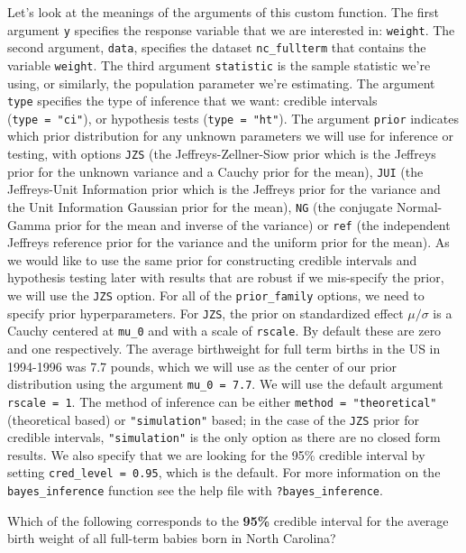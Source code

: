\documentclass[]{article}
\begin{document}
Let's look at the meanings of the arguments of this custom function. The
first argument \texttt{y} specifies the response variable that we are
interested in: \texttt{weight}. The second argument, \texttt{data},
specifies the dataset \texttt{nc\_fullterm} that contains the variable
\texttt{weight}. The third argument \texttt{statistic} is the sample
statistic we're using, or similarly, the population parameter we're
estimating. The argument \texttt{type} specifies the type of inference
that we want: credible intervals (\texttt{type\ =\ "ci"}), or hypothesis
tests (\texttt{type\ =\ "ht"}). The argument \texttt{prior} indicates
which prior distribution for any unknown parameters we will use for
inference or testing, with options \texttt{JZS} (the
Jeffreys-Zellner-Siow prior which is the Jeffreys prior for the unknown
variance and a Cauchy prior for the mean), \texttt{JUI} (the
Jeffreys-Unit Information prior which is the Jeffreys prior for the
variance and the Unit Information Gaussian prior for the mean),
\texttt{NG} (the conjugate Normal-Gamma prior for the mean and inverse
of the variance) or \texttt{ref} (the independent Jeffreys reference
prior for the variance and the uniform prior for the mean). As we would
like to use the same prior for constructing credible intervals and
hypothesis testing later with results that are robust if we mis-specify
the prior, we will use the \texttt{JZS} option. For all of the
\texttt{prior\_family} options, we need to specify prior
hyperparameters. For \texttt{JZS}, the prior on standardized effect
\(\mu/\sigma\) is a Cauchy centered at \texttt{mu\_0} and with a scale
of \texttt{rscale}. By default these are zero and one respectively. The
average birthweight for full term births in the US in 1994-1996 was 7.7
pounds, which we will use as the center of our prior distribution using
the argument \texttt{mu\_0\ =\ 7.7}. We will use the default argument
\texttt{rscale\ =\ 1}. The method of inference can be either
\texttt{method\ =\ "theoretical"} (theoretical based) or
\texttt{"simulation"} based; in the case of the \texttt{JZS} prior for
credible intervals, \texttt{"simulation"} is the only option as there
are no closed form results. We also specify that we are looking for the
95\% credible interval by setting \texttt{cred\_level\ =\ 0.95}, which
is the default. For more information on the \texttt{bayes\_inference}
function see the help file with \texttt{?bayes\_inference}.

Which of the following corresponds to the \textbf{95\%} credible
interval for the average birth weight of all full-term babies born in
North Carolina?
\end{document}
